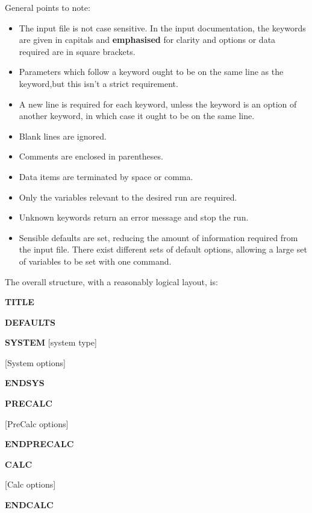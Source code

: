 \documentclass[openany,a4paper,10pt,english]{manual}
\begin{document}
General points to note:
\begin{itemize}
\item {} 
The input file is not case sensitive.  In the input documentation, the keywords are given in capitals and \textbf{emphasised} for clarity and options or data required are in square brackets.

\item {} 
Parameters which follow a keyword ought to be on the same line as the keyword,but this isn't a strict requirement.

\item {} 
A new line is required for each keyword, unless the keyword is an option of another keyword, in which case it ought to be on the same line.

\item {} 
Blank lines are ignored.

\item {} 
Comments are enclosed in parentheses.

\item {} 
Data items are terminated by space or comma.

\item {} 
Only the variables relevant to the desired run are required.

\item {} 
Unknown keywords return an error message and stop the run.

\item {} 
Sensible defaults are set, reducing the amount of information required from the input file.  There exist different sets of default options, allowing a large set of variables to be set with one command.

\end{itemize}

The overall structure, with a reasonably logical layout, is:

\textbf{TITLE}

\textbf{DEFAULTS}

\textbf{SYSTEM} {[}system type{]}

{[}System options{]}

\textbf{ENDSYS}

\textbf{PRECALC}

{[}PreCalc options{]}

\textbf{ENDPRECALC}

\textbf{CALC}

{[}Calc options{]}

\textbf{ENDCALC}
\end{document}
